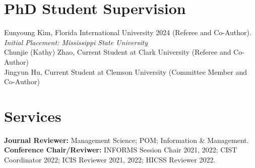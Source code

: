 \documentclass[margin,line]{resume}
\begin{document}
\begin{resume}


      \section{\mysidestyle PhD Student Supervision} 
         Eunyoung Kim, Florida International University 2024 (Referee and Co-Author). \textit{Initial Placement: Mississippi State University} \\
         Chunjie (Kathy) Zhao, Current Student at Clark University (Referee and Co-Author)\\
         Jingyun Hu, Current Student at Clemson University (Committee Member and Co-Author)\\
         

      \section{\mysidestyle Services} 
         \textbf{Journal Reviewer:} Management Science; POM; Information \& Management.\\
         \textbf{Conference Chair/Reviwer:} INFORMS Session Chair 2021, 2022; CIST Coordinator 2022; ICIS Reviewer 2021, 2022; HICSS Reviewer 2022.


\end{resume}
\end{document}
